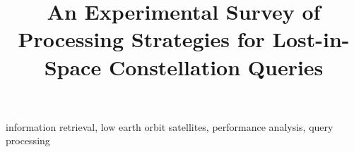 \documentclass[conference]{IEEEtran}
\begin{document}
	\title{An Experimental Survey of Processing Strategies for Lost-in-Space Constellation Queries}

	\author{
	\and
	}

	\maketitle

	
    \begin{IEEEkeywords}
        information retrieval, low earth orbit satellites, performance analysis, query processing
    \end{IEEEkeywords}

	
%	
	
	
	
	
    
    \balance

	
	
\end{document}
